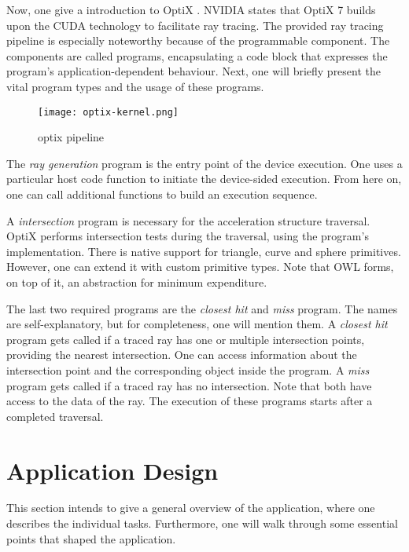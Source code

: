 Now, one give a introduction to OptiX \cite{nvidia_nvidia_2022}.
NVIDIA states that OptiX 7 builds upon the CUDA technology to facilitate ray tracing.
The provided ray tracing pipeline is especially noteworthy because of the programmable component.
The components are called programs, encapsulating a code block that expresses the program's application-dependent behaviour.
Next, one will briefly present the vital program types and the usage of these programs.

\begin{figure}[h]
    \begin{center}
        \texttt{[image: optix-kernel.png]}
    \end{center}
    \caption{optix pipeline \cite{nvidia_nvidia_2022}}
    \label{fig:optix-kernel}
\end{figure}

The \textit{ray generation} program is the entry point of the device execution.
One uses a particular host code function to initiate the device-sided execution.
From here on, one can call additional functions to build an execution sequence.

A \textit{intersection} program is necessary for the acceleration structure traversal.
OptiX performs intersection tests during the traversal, using the program's implementation.
There is native support for triangle, curve and sphere primitives.
However, one can extend it with custom primitive types.
Note that OWL forms, on top of it, an abstraction for minimum expenditure.

The last two required programs are the \textit{closest hit} and \textit{miss} program.
The names are self-explanatory, but for completeness, one will mention them.
A \textit{closest hit} program gets called if a traced ray has one or multiple intersection points, providing the nearest intersection.
One can access information about the intersection point and the corresponding object inside the program.
A \textit{miss} program gets called if a traced ray has no intersection.
Note that both have access to the data of the ray.
The execution of these programs starts after a completed traversal.

\section{Application Design}

This section intends to give a general overview of the application, where one describes the individual tasks.
Furthermore, one will walk through some essential points that shaped the application.

